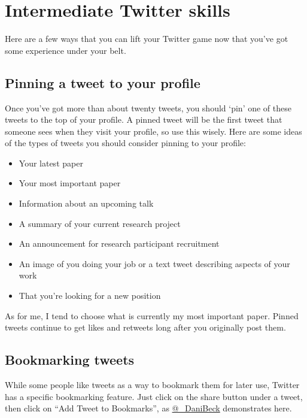 \documentclass[]{book}
\providecommand{\tightlist}{%
  \setlength{\itemsep}{0pt}\setlength{\parskip}{0pt}}
\begin{document}
\hypertarget{intermediate-twitter-skills}{%
\chapter{Intermediate Twitter skills}\label{intermediate-twitter-skills}}

Here are a few ways that you can lift your Twitter game now that you've got some experience under your belt.

\hypertarget{pinning-a-tweet-to-your-profile}{%
\section{Pinning a tweet to your profile}\label{pinning-a-tweet-to-your-profile}}

Once you've got more than about twenty tweets, you should `pin' one of these tweets to the top of your profile. A pinned tweet will be the first tweet that someone sees when they visit your profile, so use this wisely. Here are some ideas of the types of tweets you should consider pinning to your profile:

\begin{itemize}
\tightlist
\item
  Your latest paper
\item
  Your most important paper
\item
  Information about an upcoming talk
\item
  A summary of your current research project
\item
  An announcement for research participant recruitment
\item
  An image of you doing your job or a text tweet describing aspects of your work
\item
  That you're looking for a new position
\end{itemize}

As for me, I tend to choose what is currently my most important paper. Pinned tweets continue to get likes and retweets long after you originally post them.

\hypertarget{bookmarking-tweets}{%
\section{Bookmarking tweets}\label{bookmarking-tweets}}

While some people like tweets as a way to bookmark them for later use, Twitter has a specific bookmarking feature. Just click on the share button under a tweet, then click on ``Add Tweet to Bookmarks'', as \href{https://twitter.com/_DaniBeck}{@\_DaniBeck} demonstrates here.
\end{document}
